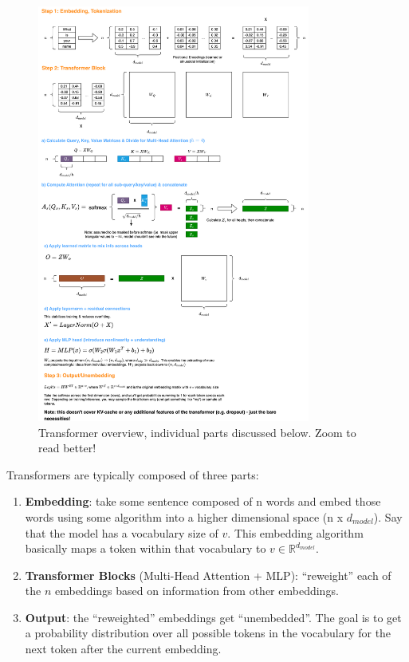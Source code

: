\documentclass[12pt]{article}
\begin{document}
\begin{figure}[H]
    \centering
    \includegraphics[width=0.8\textwidth]{../media/transformer.png}
    \caption{Transformer overview, individual parts discussed below. Zoom to read better!}
    \label{fig:transformer}
\end{figure}

Transformers are typically composed of three parts:
\begin{enumerate}
  \item \textbf{Embedding}: take some sentence composed of n words and embed those words using some algorithm into a higher dimensional space (n x $d_{model}$). Say that the model has a vocabulary size of $v$. This embedding algorithm basically maps a token within that vocabulary to $v \in \mathbb{R}^{d_{model}}$.
  \item \textbf{Transformer Blocks} (Multi-Head Attention + MLP): \enquote{reweight} each of the $n$ embeddings based on information from other embeddings. 
  \item \textbf{Output}: the \enquote{reweighted} embeddings get \enquote{unembedded}. The goal is to get a probability distribution over all possible tokens in the vocabulary for the next token after the current embedding.
\end{enumerate}
\end{document}
